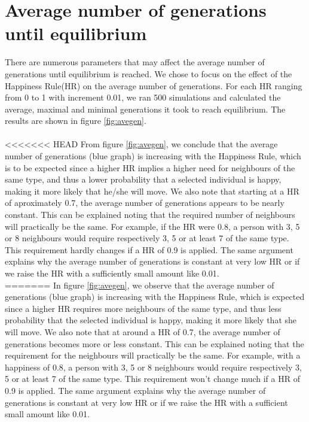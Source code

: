 
\section{Average number of generations until equilibrium}
There are numerous parameters that may affect the average number of generations until  equilibrium is reached. We chose to focus on the effect of the Happiness Rule(HR) on the average number of generations. For each HR ranging from 0 to 1 with increment 0.01, we ran 500 simulations and calculated the average, maximal and minimal generations it took to reach equilibrium. The results are shown in figure \ref{fig:avegen}.\\
\\
<<<<<<< HEAD
From figure \ref{fig:avegen}, we conclude that the average number of generations (blue graph) is increasing with the Happiness Rule, which is to be expected since a higher HR implies a higher need for neighbours of the same type, and thus a lower probability that a selected individual is happy, making it more likely that he/she will move. We also note that starting at a HR of aproximately 0.7, the average number of generations appears to be nearly constant. This can be explained noting that the required number of neighbours will practically be the same. For example, if the HR were 0.8, a person with 3, 5 or 8 neighbours would require respectively 3, 5 or at least 7 of the same type. This requirement hardly changes if a HR of 0.9 is applied. The same argument explains why the average number of generations is constant at very low HR or if we raise the HR with a sufficiently small amount like 0.01.\\
=======
In figure \ref{fig:avegen}, we observe that the average number of generations (blue graph) is increasing with the Happiness Rule, which is expected since a higher HR requires more neighbours of the same type, and thus less probability that the selected individual is happy, making it more likely that she will move. We also note that at around a HR of 0.7, the average number of generations becomes more or less constant. This can be explained noting that the requirement for the neighbours will practically be the same. For example, with a happiness of 0.8, a person with 3, 5 or 8 neighbours would require respectively 3, 5 or at least 7 of the same type. This requirement won't change much if a HR of 0.9 is applied. The same argument explains why the average number of generations is constant at very low HR or if we raise the HR with a sufficient small amount like 0.01.\\
